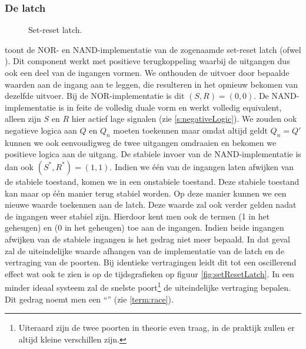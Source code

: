 \subsubsection{De latch}
\begin{figure}[hbt]
\centering
{}
\caption{Set-reset latch.}
\end{figure}
 toont de NOR- en NAND-implementatie van de zogenaamde set-reset latch (ofwel ). Dit component werkt met positieve terugkoppeling waarbij de uitgangen dus ook een deel van de ingangen vormen. We onthouden de uitvoer door bepaalde waarden aan de ingang aan te leggen, die resulteren in het opnieuw bekomen van dezelfde uitvoer. Bij de NOR-implementatie is dit $\left(S,R\right)=\left(0,0\right)$. De NAND-implementatie is in feite de volledig duale vorm en werkt volledig equivalent, alleen zijn $S$ en $R$ hier actief lage signalen (zie \ref{s:negativeLogic}). We zouden ook negatieve logica aan $Q$ en $Q_n$ moeten toekennen maar omdat altijd geldt $Q_n=Q'$ kunnen we ook eenvoudigweg de twee uitgangen omdraaien en bekomen we positieve logica aan de uitgang. De stabiele invoer van de NAND-implementatie is dan ook $\left(S^*,R^*\right)=\left(1,1\right)$. Indien we \'e\'en van de ingangen laten afwijken van de stabiele toestand, komen we in een onstabiele toestand. Deze stabiele toestand kan maar op \'e\'en manier terug stabiel worden. Op deze manier kunnen we een nieuwe waarde toekennen aan de latch. Deze waarde zal ook verder gelden nadat de ingangen weer stabiel zijn. Hierdoor kent men ook de termen  (1 in het geheugen) en  (0 in het geheugen) toe aan de ingangen. Indien beide ingangen afwijken van de stabiele ingangen is het gedrag niet meer bepaald. In dat geval zal de uiteindelijke waarde afhangen van de implementatie van de latch en de vertraging van de poorten. Bij identieke vertragingen leidt dit tot een oscillerend effect wat ook te zien is op de tijdsgrafieken op figuur \ref{fig:setResetLatch}. In een minder ideaal systeem zal de snelste poort\footnote{Uiteraard zijn de twee poorten in theorie even traag, in de praktijk zullen er altijd kleine verschillen zijn.} de uiteindelijke vertraging bepalen. Dit gedrag noemt men een ``'' (zie \ref{term:race}).
